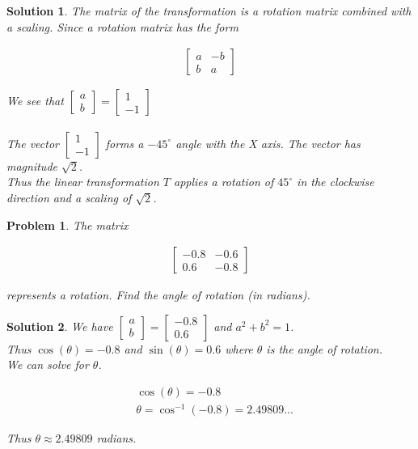 \documentclass{article}
\newtheorem{problem}{Problem}
\newtheorem*{solution}{Solution}
\begin{document}
\begin{solution}
The matrix of the transformation is a rotation matrix combined with a scaling. Since a rotation matrix has the form 

\begin{align*}
\begin{bmatrix} a & -b \\ b & a \end{bmatrix}
\end{align*}

We see that $\begin{bmatrix} a \\ b \end{bmatrix} = \begin{bmatrix} 1 \\ -1 \end{bmatrix}$ \\ \\

The vector $\begin{bmatrix} 1 \\ -1 \end{bmatrix}$ forms a $-45^\circ$ angle with the X axis. The vector has magnitude $\sqrt{2}$. \\

Thus the linear transformation $T$ applies a rotation of $45^\circ$ in the clockwise direction and a scaling of $\sqrt{2}$.
\end{solution}

\begin{problem}
The matrix 

\begin{align*}
\begin{bmatrix}
-0.8 & -0.6 \\ 
0.6 & -0.8
\end{bmatrix}
\end{align*}

represents a rotation. Find the angle of rotation (in radians).
\end{problem}

\begin{solution}
We have $\begin{bmatrix} a \\ b \end{bmatrix} = \begin{bmatrix} -0.8 \\ 0.6 \end{bmatrix}$ and $a^2 + b^2 = 1$. \\

Thus $\cos(\theta) = -0.8$ and $\sin(\theta) = 0.6$ where $\theta$ is the angle of rotation. \\

We can solve for $\theta$.

\begin{align*}
& \cos(\theta) = -0.8 \\
& \theta = \cos^{-1}(-0.8) = 2.49809... 
\end{align*}

Thus $\theta \approx 2.49809$ radians.
\end{solution}
\end{document}

